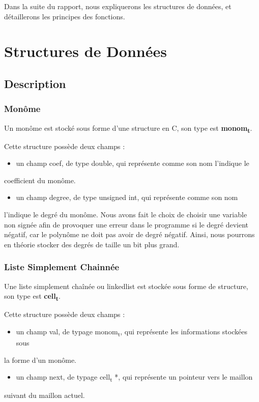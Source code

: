 \documentclass[11pt]{article}
\begin{document}
Dans la suite du rapport, nous expliquerons les structures de données, et détaillerons
les principes des fonctions. 

\section{Structures de Données}
\label{sec:org7e918b9}

\subsection{Description}
\label{sec:org4624cf5}
\subsubsection{Monôme}
\label{sec:org4f7efb3}
Un monôme est stocké sous forme d'une structure en C, son type est \textbf{monom\textsubscript{t}}.

Cette structure possède deux champs :
\begin{itemize}
\item un champ coef, de type double, qui représente comme son nom l'indique le
\end{itemize}
coefficient du monôme.
\begin{itemize}
\item un champ degree, de type unsigned int, qui représente comme son nom
\end{itemize}
l'indique le degré du monôme. Nous avons fait le choix de choisir une variable
non signée afin de provoquer une erreur dans le programme si le degré devient
négatif, car le polynôme ne doit pas avoir de degré négatif. Ainsi, nous
pourrons en théorie stocker des degrés de taille un bit plus grand.

\subsubsection{Liste Simplement Chainnée}
\label{sec:org7acf763}

Une liste simplement chaînée ou linkedlist est stockée sous forme de structure, son type est
\textbf{cell\textsubscript{t}}.

Cette structure possède deux champs :
\begin{itemize}
\item un champ val, de typage monom\textsubscript{t}, qui représente les informations stockées sous
\end{itemize}
la forme d'un monôme. 
\begin{itemize}
\item un champ next, de typage cell\textsubscript{t} *, qui représente un pointeur vers le maillon
\end{itemize}
suivant du maillon actuel.
\end{document}
